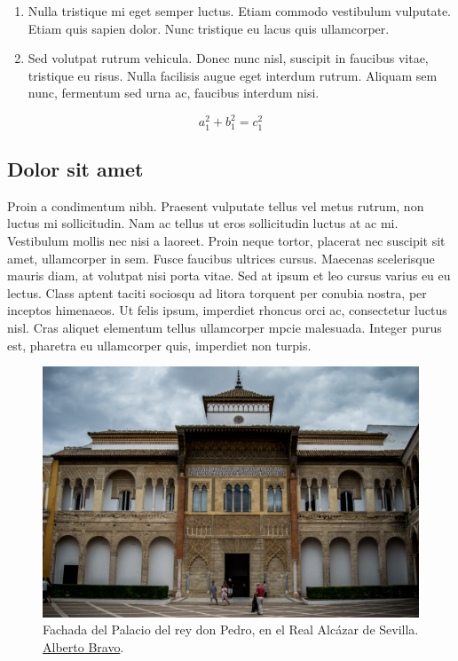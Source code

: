 \begin{enumerate}
    \item Nulla tristique mi eget semper luctus. Etiam commodo vestibulum vulputate. Etiam quis sapien dolor. Nunc tristique eu lacus quis ullamcorper. 
    \item Sed volutpat rutrum vehicula. Donec nunc nisl, suscipit in faucibus vitae, tristique eu risus. Nulla facilisis augue eget interdum rutrum. Aliquam sem nunc, fermentum sed urna ac, faucibus interdum nisi.
\end{enumerate}

\begin{equation}
        a_1^2 + b_1^2 = c_1^2
\end{equation}



\subsection{Dolor sit amet}

Proin a condimentum nibh.  Praesent vulputate tellus vel metus rutrum, non luctus mi sollicitudin. Nam ac tellus ut eros sollicitudin luctus at ac mi. Vestibulum mollis nec nisi a laoreet. Proin neque tortor, placerat nec suscipit sit amet, ullamcorper in sem. Fusce faucibus ultrices cursus. Maecenas scelerisque mauris diam, at volutpat nisi porta vitae. Sed at ipsum et leo cursus varius eu eu lectus. Class aptent taciti sociosqu ad litora torquent per conubia nostra, per inceptos himenaeos. Ut felis ipsum, imperdiet rhoncus orci ac, consectetur luctus nisl. Cras aliquet elementum tellus ullamcorper \glsdesc{mpcie} malesuada. Integer purus est, pharetra eu ullamcorper quis, imperdiet non turpis.


\begin{figure}
    \centering
    \includegraphics[width=\linewidth]{figures/examples/palacio_del_rey_don_pedro.jpg}
    \caption[Fachada del Palacio del rey don Pedro, en el Real Alcázar de Sevilla.]{Fachada del Palacio del rey don Pedro, en el Real Alcázar de Sevilla. \href{https://commons.wikimedia.org/wiki/File:Fachada_del_Palacio_del_rey_don_Pedro.jpg}{Alberto Bravo}.}
    \label{fig:cha1:donpedro}
\end{figure}





